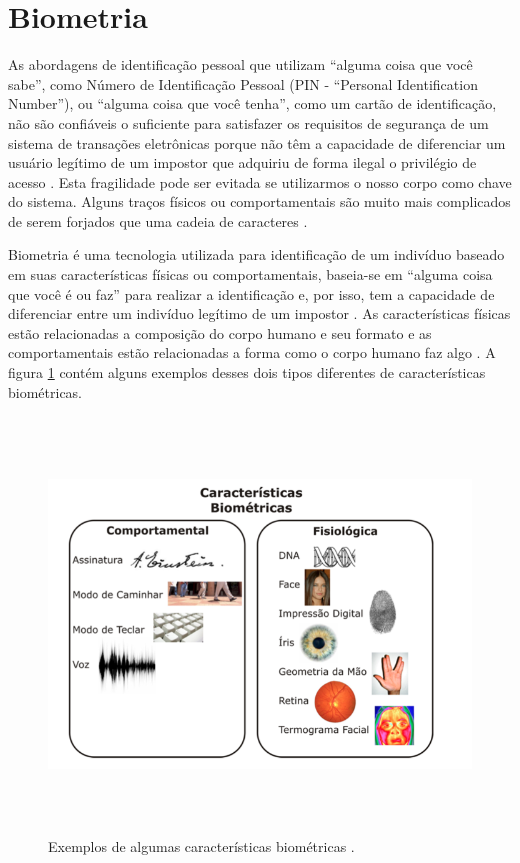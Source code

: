 \section{Biometria}

As abordagens de identificação pessoal que utilizam ``alguma coisa que você sabe'', como Número de Identificação Pessoal (PIN - ``Personal Identification Number''), ou ``alguma coisa que você tenha'', como um cartão de identificação, não são confiáveis o suficiente para satisfazer os requisitos de segurança de um sistema de transações eletrônicas porque não têm a capacidade de diferenciar um usuário legítimo de um impostor que adquiriu de forma ilegal o privilégio de acesso \cite{hong}. Esta fragilidade pode ser evitada se utilizarmos o nosso corpo como chave do sistema. Alguns traços físicos ou comportamentais são muito mais complicados de serem forjados que uma cadeia de caracteres \cite{drovetto}.

Biometria é uma tecnologia utilizada para identificação de um indivíduo baseado em suas características físicas ou comportamentais, baseia-se em ``alguma coisa que você é ou faz'' para realizar a identificação e, por isso, tem a capacidade de diferenciar entre um indivíduo legítimo de um impostor \cite{hong}. As características físicas estão relacionadas a composição do corpo humano e seu formato e as comportamentais estão relacionadas a forma como o corpo humano faz algo \cite{drovetto}. A figura \ref{caracteristicasBiometricas} contém alguns exemplos desses dois tipos diferentes de características biométricas.

	\begin{figure}[hbt]
		\begin{center}
			\includegraphics[height=11cm,width=17cm]{figuras/2.FundamentacaoTeorica/caracteristicasBiometricas.png}
		\end{center}
		\caption{Exemplos de algumas características biométricas \cite{drovetto}.}
		\label{caracteristicasBiometricas}
	\end{figure}


